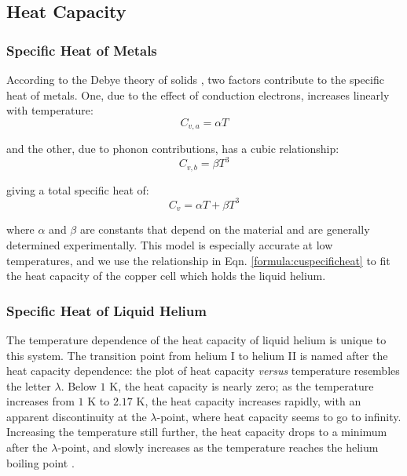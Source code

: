 \subsection{Heat Capacity}\label{heatcapacity}

\subsubsection{Specific Heat of Metals}\label{specificheatofmetals}

According to the Debye theory of solids \cite{schroeder}, two factors
contribute to the specific heat of metals. One, due to the effect of
conduction electrons, increases linearly with temperature:
\begin{equation}
C_{v,a} = \alpha T
\end{equation}

and the other, due to phonon contributions, has a cubic relationship:
\begin{equation}
C_{v,b} = \beta T^3
\end{equation}

giving a total specific heat of:
\begin{equation}\label{formula:cuspecificheat}
C_v=  \alpha T + \beta T^3
\end{equation}

where $\alpha$ and $\beta$ are constants that depend on the material
and are generally determined experimentally. This model is especially
accurate at low temperatures, and we use the relationship in Eqn.
\ref{formula:cuspecificheat} to fit the heat capacity of the copper
cell which holds the liquid helium.

\subsubsection{Specific Heat of Liquid Helium}\label{specificheatofliquidhelium}

The temperature dependence of the heat capacity of liquid helium is
unique to this system. The transition point from helium I to helium II
is named after the heat capacity dependence: the plot of heat capacity
\emph{versus} temperature resembles the letter $\lambda$. Below $1$ K, the
heat capacity is nearly zero; as the temperature increases from $1$ K to
$2.17$ K, the heat capacity increases rapidly, with an apparent
discontinuity at the $\lambda$-point, where heat capacity seems to go
to infinity. Increasing the temperature still further, the heat
capacity drops to a minimum after the $\lambda$-point, and slowly
increases as the temperature reaches the helium boiling point
\cite{atkins}.

